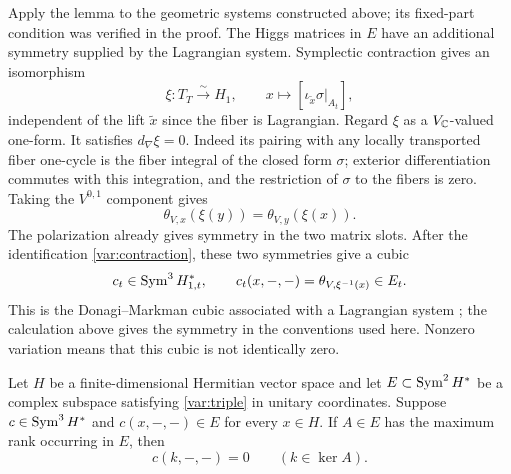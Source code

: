 Apply the lemma to the geometric systems constructed above; its
fixed-part condition was verified in the proof.  The Higgs matrices
in $E$ have an additional symmetry supplied by
the Lagrangian system.  Symplectic contraction gives an isomorphism
\begin{equation}
 \xi:T_T\xrightarrow{\ \sim\ }H_1,
       \qquad x\longmapsto[\iota_{\widetilde x}\sigma|_{A_t}],
 \label{var:contraction}
\end{equation}
independent of the lift $\widetilde x$ since the fiber is Lagrangian.
Regard $\xi$ as a $V_\mathbb C$-valued one-form.  It satisfies
$d_\nabla\xi=0$.  Indeed its pairing with any locally transported
fiber one-cycle is the fiber integral of the closed form $\sigma$;
exterior differentiation commutes with this integration, and the
restriction of $\sigma$ to the fibers is zero.  Taking the
$V^{0,1}$ component gives
\[
       \theta_{V,x}(\xi(y))=\theta_{V,y}(\xi(x)).
\]
The polarization already gives symmetry in the two matrix slots.
After the identification \eqref{var:contraction}, these two
symmetries give a cubic
\begin{equation}
 c_t\in\operatorname{Sym}^3H_{1,t}^*,\qquad
          c_t(x,-,-)=\theta_{V,\xi^{-1}(x)}\in E_t.
 \label{var:cubic}
\end{equation}
This is the Donagi--Markman cubic associated with a Lagrangian system
\cite[Section~7.2, Lemmas~7.1--7.2 and Remark~7.3]{DonagiMarkman1996};
the calculation above gives the symmetry in the conventions used here.
Nonzero variation means that this cubic is not identically zero.

\begin{lemma}
\label{var:matrix}
Let $H$ be a finite-dimensional Hermitian vector space and let
$E\subset\operatorname{Sym}^2 H^*$ be a complex subspace satisfying
\eqref{var:triple} in unitary coordinates.  Suppose
$c\in\operatorname{Sym}^3H^*$ and $c(x,-,-)\in E$ for every $x\in H$.
If $A\in E$ has the maximum rank occurring in $E$, then
\[
                c(k,-,-)=0\qquad(k\in\ker A).
\]
\end{lemma}

